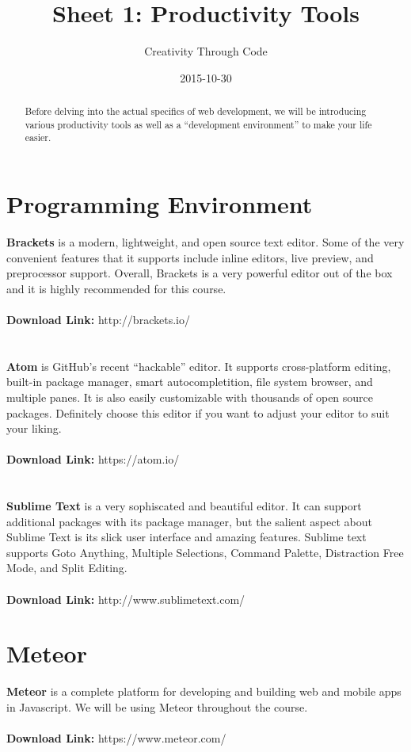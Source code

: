 \documentclass[11pt, letterpaper]{article}
\title{Sheet 1: Productivity Tools}
\date{2015-10-30}
\author{Creativity Through Code}
\begin{document}
	\maketitle
	\newpage
	\begin{abstract}
		Before delving into the actual specifics of web development, we will be introducing various productivity tools as well as a ``development environment'' to make your life easier.
	\end{abstract}
	\section{Programming Environment}
		\textbf{Brackets} is a modern, lightweight, and open source text editor. Some of the very convenient features that it supports include inline editors, live preview, and preprocessor support. Overall, Brackets is a very powerful editor out of the box and it is highly recommended for this course.
		\\\\
		\textbf{Download Link:} http://brackets.io/
		\\\\\\
		\textbf{Atom} is GitHub's recent ``hackable'' editor. It supports cross-platform editing, built-in package manager, smart autocompletition, file system browser, and multiple panes. It is also easily customizable with thousands of open source packages. Definitely choose this editor if you want to adjust your editor to suit your liking.
		\\\\
		\textbf{Download Link:} https://atom.io/
		\\\\\\
		\textbf{Sublime Text} is a very sophiscated and beautiful editor. It can support additional packages with its package manager, but the salient aspect about Sublime Text is its slick user interface and amazing features. Sublime text supports Goto Anything, Multiple Selections, Command Palette, Distraction Free Mode, and Split Editing.
		\\\\
		\textbf{Download Link:} http://www.sublimetext.com/ 
	\section{Meteor}
		\textbf{Meteor} is a complete platform for developing and building web and mobile apps in Javascript. We will be using Meteor throughout the course.
		\\\\
		\textbf{Download Link:} https://www.meteor.com/
\end{document}
